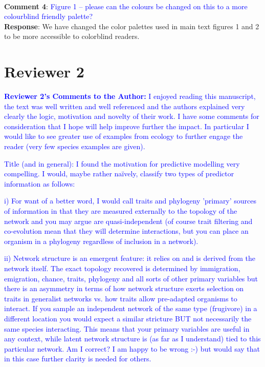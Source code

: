 \documentclass{article}
\begin{document}
\\
\textbf{Comment 4}: \textcolor{blue}{Figure 1 – please can the colours be changed on this to a more colourblind friendly palette?} \\
\textbf{Response}: We have changed the color palettes used in main text figures 1 and 2 to be more accessible to colorblind readers. 
\\

\section{Reviewer 2}
\textcolor{blue}{\textbf{Reviewer 2's Comments to the Author:}}
\textcolor{blue}{I enjoyed reading this manuscript, the text was well written and well referenced and the authors explained very clearly the logic, motivation and novelty of their work. I have some comments for consideration that I hope will help improve further the impact. In particular I would like to see greater use of examples from ecology to further engage the reader (very few species examples are given).}

\textcolor{blue}{Title (and in general): I found the motivation for predictive modelling very compelling. I would, maybe rather naïvely, classify two types of predictor information as follows:}

\textcolor{blue}{i) For want of a better word, I would call traits and phylogeny 'primary' sources of information in that they are measured externally to the topology of the network and you may argue are quasi-independent (of course trait filtering and co-evolution mean that they will determine interactions, but you can place an organism in a phylogeny regardless of inclusion in a network).}

\textcolor{blue}{ii) Network structure is an emergent feature: it relies on and is derived from the network itself. The exact topology recovered is determined by immigration, emigration, chance, traits, phylogeny and all sorts of other primary variables but there is an asymmetry in terms of how network structure exerts selection on traits in generalist networks vs. how traits allow pre-adapted organisms to interact. If you sample an independent network of the same type (frugivore) in a different location you would expect a similar stricture BUT not necessarily the same species interacting. This means that your primary variables are useful in any context, while latent network structure is (as far as I understand) tied to this particular network. Am I correct? I am happy to be wrong :-) but would say that in this case further clarity is needed for others.}
\end{document}
